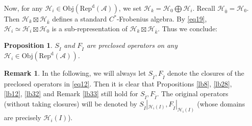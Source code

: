\documentclass[12pt,a4paper]{article}
\theoremstyle{definition}
\newtheorem{rem}[df]{Remark}
\theoremstyle{plain}
\newtheorem{pp}[df]{Proposition}
\newcommand{\mc}{\mathcal}
\newcommand{\wtd}{\widetilde}
\newcommand{\ovl}{\overline}
\newcommand{\id}{\mathbf{1}}
\newcommand{\ev}{\mathrm{ev}}
\newcommand{\RepdA}{\mathrm{Rep}^{\mathrm d}(\mc A)}
\newcommand{\Obj}{\mathrm{Obj}}
\numberwithin{equation}{section}
\begin{document}



Now, for any $\mc H_i\in\Obj(\RepdA)$, we set $\mc H_k=\mc H_0\bigoplus\mc H_i$. Recall $\mc H_{\ovl 0}=\mc H_0$. Then $\mc H_k\boxtimes\mc H_{\ovl k}$ defines a standard $C^*$-Frobenius algebra. By \eqref{eq19}, $\mc H_i\simeq\mc H_i\boxtimes\mc H_0$ is a sub-representation of $\mc H_k\boxtimes\mc H_{\ovl k}$. Thus we conclude:

\begin{pp}
$S_{\wtd I}$ and $F_{\wtd I}$ are preclosed operators on any $\mc H_i\in\Obj(\RepdA)$.
\end{pp}

\begin{rem}
In the following, we will always let $S_{\wtd I},F_{\wtd I}$  denote the closures of the preclosed operators in \eqref{eq12}. Then it is clear that Propositions \ref{lb8}, \ref{lb28}, \ref{lb12}, \ref{lb32} and Remark \ref{lb33} still hold for $S_{\wtd I},F_{\wtd I}$. The original operators (without taking closures) will be denoted by $S_{\wtd I}|_{\mc H_i(I)},F_{\wtd I}|_{\mc H_i(I)}$ (whose domains are precisely $\mc H_i(I)$).
\end{rem}
\end{document}
